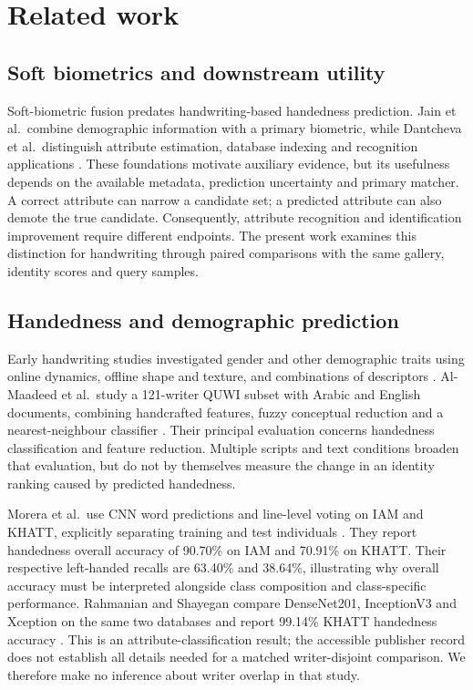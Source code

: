 \documentclass[ASNA,twocolumn]{USG}
\begin{document}
\section{Related work}
\label{sec:related}
\subsection{Soft biometrics and downstream utility}
Soft-biometric fusion predates handwriting-based handedness prediction. Jain et al.\ combine demographic information with a primary biometric, while Dantcheva et al.\ distinguish attribute estimation, database indexing and recognition applications \cite{jain2004soft,dantcheva2016soft}. These foundations motivate auxiliary evidence, but its usefulness depends on the available metadata, prediction uncertainty and primary matcher. A correct attribute can narrow a candidate set; a predicted attribute can also demote the true candidate. Consequently, attribute recognition and identification improvement require different endpoints. The present work examines this distinction for handwriting through paired comparisons with the same gallery, identity scores and query samples.

\subsection{Handedness and demographic prediction}
Early handwriting studies investigated gender and other demographic traits using online dynamics, offline shape and texture, and combinations of descriptors \cite{liwicki2011gender,siddiqi2015gender,bouadjenek2016soft,hassaine2013icdar}. Al-Maadeed et al.\ study a 121-writer QUWI subset with Arabic and English documents, combining handcrafted features, fuzzy conceptual reduction and a nearest-neighbour classifier \cite{almaadeed2016handedness}. Their principal evaluation concerns handedness classification and feature reduction. Multiple scripts and text conditions broaden that evaluation, but do not by themselves measure the change in an identity ranking caused by predicted handedness.

Morera et al.\ use CNN word predictions and line-level voting on IAM and KHATT, explicitly separating training and test individuals \cite{morera2018handedness}. They report handedness overall accuracy of 90.70\% on IAM and 70.91\% on KHATT. Their respective left-handed recalls are 63.40\% and 38.64\%, illustrating why overall accuracy must be interpreted alongside class composition and class-specific performance. Rahmanian and Shayegan compare DenseNet201, InceptionV3 and Xception on the same two databases and report 99.14\% KHATT handedness accuracy \cite{rahmanian2021handedness}. This is an attribute-classification result; the accessible publisher record does not establish all details needed for a matched writer-disjoint comparison. We therefore make no inference about writer overlap in that study.
\end{document}
